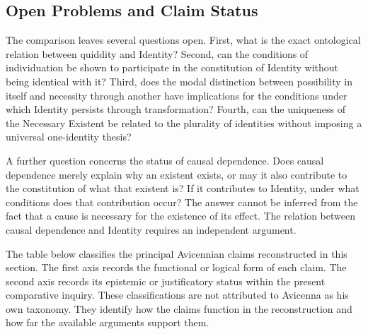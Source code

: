 \subsection{Open Problems and Claim Status}
\label{subsec:ch08-avicenna-open-problems}

\label{para:VS.B01.P01.C08.S13.SS18.P001}

The comparison leaves
several questions
open. First,
what is
the exact
ontological relation
between quiddity
and Identity?
Second, can
the conditions
of individuation
be shown
to participate
in the constitution
of Identity
without being
identical with
it? Third,
does the
modal distinction
between possibility
in itself
and necessity
through another
have implications
for the
conditions under
which Identity
persists through
transformation? Fourth,
can the
uniqueness of
the Necessary
Existent be
related to
the plurality
of identities
without imposing
a universal
one-identity thesis?

\label{para:VS.B01.P01.C08.S13.SS18.P002}

A further
question concerns
the status
of causal
dependence. Does
causal dependence
merely explain
why an
existent exists,
or may it
also contribute
to the constitution
of what
that existent
is? If
it contributes
to Identity,
under what
conditions does
that contribution
occur? The
answer cannot
be inferred
from the
fact that
a cause
is necessary
for the
existence of
its effect.
The relation
between causal
dependence and
Identity requires
an independent
argument.

\label{para:VS.B01.P01.C08.S13.SS18.P003}

The table below
classifies the
principal Avicennian
claims reconstructed
in this section.
The first
axis records
the functional
or logical
form of
each claim.
The second
axis records
its epistemic
or justificatory
status within
the present
comparative inquiry.
These classifications
are not
attributed to
Avicenna as
his own
taxonomy. They
identify how
the claims
function in
the reconstruction
and how
far the
available arguments
support them.



\label{para:VS.B01.P01.C08.S13.SS18.P004}

